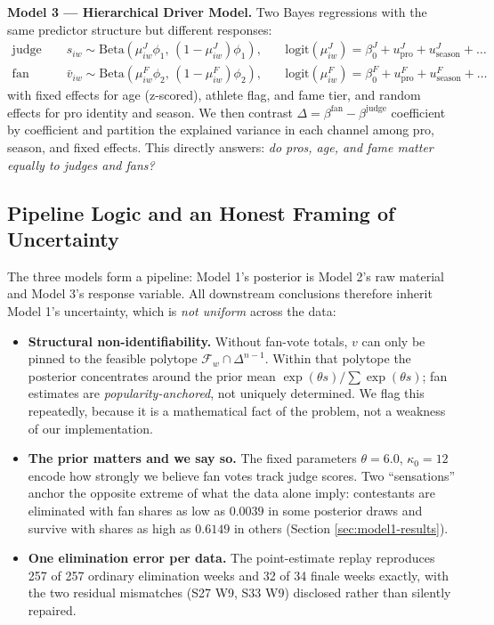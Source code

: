 \documentclass{article}
\begin{document}
\textbf{Model 3 --- Hierarchical Driver Model.}
Two Bayes regressions with the same predictor structure but different responses:
\begin{align}
\text{judge share:}\quad & s_{iw} \sim \mathrm{Beta}(\mu^{J}_{iw}\phi_1,\,(1-\mu^{J}_{iw})\phi_1), & \quad \mathrm{logit}(\mu^J_{iw}) = \beta^J_0 + u^{J}_{\text{pro}} + u^{J}_{\text{season}} + \ldots \\
\text{fan share:}\quad & \bar v_{iw} \sim \mathrm{Beta}(\mu^{F}_{iw}\phi_2,\,(1-\mu^{F}_{iw})\phi_2), & \quad \mathrm{logit}(\mu^F_{iw}) = \beta^F_0 + u^{F}_{\text{pro}} + u^{F}_{\text{season}} + \ldots
\end{align}
with fixed effects for age (z-scored), athlete flag, and fame tier, and random effects for pro identity and season. We then contrast $\Delta = \beta^{\text{fan}} - \beta^{\text{judge}}$ coefficient by coefficient and partition the explained variance in each channel among pro, season, and fixed effects. This directly answers: \emph{do pros, age, and fame matter equally to judges and fans?}

\subsection{Pipeline Logic and an Honest Framing of Uncertainty}

The three models form a pipeline: Model 1's posterior is Model 2's raw material and Model 3's response variable. All downstream conclusions therefore inherit Model 1's uncertainty, which is \emph{not uniform} across the data:

\begin{itemize}
  \item \textbf{Structural non-identifiability.} Without fan-vote totals, $v$ can only be pinned to the feasible polytope $\mathcal{F}_w \cap \Delta^{n-1}$. Within that polytope the posterior concentrates around the prior mean $\exp(\theta s)/\sum \exp(\theta s)$; fan estimates are \emph{popularity-anchored}, not uniquely determined. We flag this repeatedly, because it is a mathematical fact of the problem, not a weakness of our implementation.
  \item \textbf{The prior matters and we say so.} The fixed parameters $\theta = 6.0$, $\kappa_0 = 12$ encode how strongly we believe fan votes track judge scores. Two ``sensations'' anchor the opposite extreme of what the data alone imply: contestants are eliminated with fan shares as low as $0.0039$ in some posterior draws and survive with shares as high as $0.6149$ in others (Section \ref{sec:model1-results}).
  \item \textbf{One elimination error per data.} The point-estimate replay reproduces 257 of 257 ordinary elimination weeks and 32 of 34 finale weeks exactly, with the two residual mismatches (S27 W9, S33 W9) disclosed rather than silently repaired.
\end{itemize}
\end{document}
